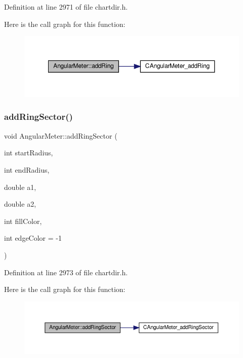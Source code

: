 Definition at line 2971 of file chartdir.\+h.

Here is the call graph for this function\+:
\nopagebreak
\begin{figure}[H]
\begin{center}
\leavevmode
\includegraphics[width=350pt]{class_angular_meter_a67b26ec28b68cac7b13922d61d2a36c9_cgraph}
\end{center}
\end{figure}
\mbox{\label{class_angular_meter_af7d1c8c5d188a2cf63a08296228fd6c3}} 
\subsubsection{\texorpdfstring{add\+Ring\+Sector()}{addRingSector()}}
{\footnotesize\ttfamily void Angular\+Meter\+::add\+Ring\+Sector (\begin{DoxyParamCaption}\item[{int}]{start\+Radius,  }\item[{int}]{end\+Radius,  }\item[{double}]{a1,  }\item[{double}]{a2,  }\item[{int}]{fill\+Color,  }\item[{int}]{edge\+Color = {\ttfamily -\/1} }\end{DoxyParamCaption})\hspace{0.3cm}{\ttfamily [inline]}}



Definition at line 2973 of file chartdir.\+h.

Here is the call graph for this function\+:
\nopagebreak
\begin{figure}[H]
\begin{center}
\leavevmode
\includegraphics[width=350pt]{class_angular_meter_af7d1c8c5d188a2cf63a08296228fd6c3_cgraph}
\end{center}
\end{figure}
\mbox{\label{class_angular_meter_a1de741912b6b62a24f7d197b4717e4b6}} 

